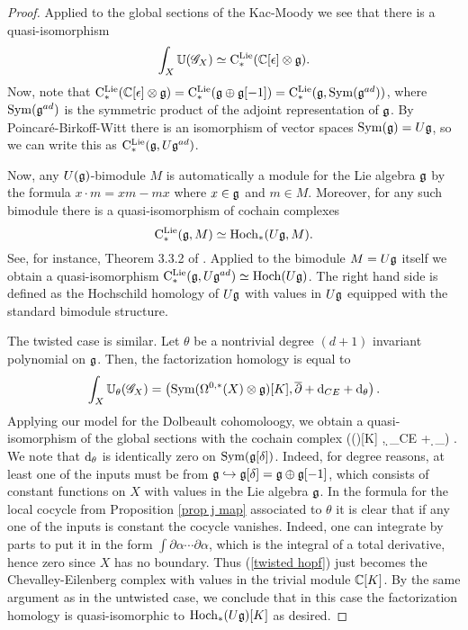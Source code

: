 \begin{proof}
Applied to the global sections of the Kac-Moody we see that there is a quasi-isomorphism
\[
\int_X \mathbb U(\mathscr G_X) \simeq {\rm C}^{\rm Lie}_*(\mathbb C[\epsilon] \otimes \mathfrak g) .
\]
Now, note that ${\rm C}^{\rm Lie}_*(\mathbb C[\epsilon] \otimes \mathfrak g) = {\rm C}^{\rm Lie}_*(\mathfrak g \oplus \mathfrak g[-1]) = {\rm C}^{\rm Lie}_*(\mathfrak g, {\rm Sym} (\mathfrak g^{ad}))$, where ${\rm Sym}(\mathfrak g^{ad})$ is the symmetric product of the adjoint representation of $\mathfrak g$. 
By Poincar\'{e}-Birkoff-Witt there is an isomorphism of vector spaces ${\rm Sym}(\mathfrak g) = U \mathfrak g$, so we can write this as ${\rm C}^{\rm Lie}_*(\mathfrak g, U \mathfrak g^{ad})$.

Now, any $U(\mathfrak g)$-bimodule $M$ is automatically a module for the Lie algebra $\mathfrak g$ by the formula $x \cdot m = xm - mx$ where $x \in \mathfrak g$ and $m \in M$.
Moreover, for any such bimodule there is a quasi-isomorphism of cochain complexes 
\[
{\rm C}^{\rm Lie}_*(\mathfrak g, M) \simeq {\rm Hoch}_*(U\mathfrak g, M) .
\]
See, for instance, Theorem 3.3.2 of \cite{LodayCyclic}.
Applied to the bimodule $M = U\mathfrak g$ itself we obtain a quasi-isomorphism ${\rm C}^{\rm Lie}_*(\mathfrak g , U\mathfrak g^{ad}) \simeq {\rm Hoch}(U\mathfrak g)$.
The right hand side is defined as the Hochschild homology of $U\mathfrak g$ with values in $U\mathfrak g$ equipped with the standard bimodule structure. 

The twisted case is similar. 
Let $\theta$ be a nontrivial degree $(d+1)$ invariant polynomial on $\mathfrak g$. 
Then, the factorization homology is equal to
\[
\int_X \mathbb U_\theta (\mathscr G_X) = \left({\rm Sym}(\Omega^{0,*}(X) \otimes \mathfrak g)[K] , \overline{\partial} + {\rm d}_{CE} + {\rm d}_\theta\right) .
\]
Applying our model for the Dolbeault cohomoloogy, we obtain a quasi-isomorphism of the global sections with the cochain complex
\beqn\label{twisted hopf}
\left(\Sym(\fg[\delta])[K] ,  \d_{CE} + \d_\theta \right) .
\eeqn
We note that ${\rm d}_\theta$ is identically zero on ${\rm Sym}(\mathfrak g[\delta])$. 
Indeed, for degree reasons, at least one of the inputs must be from $\mathfrak g \hookrightarrow \mathfrak g[\delta] = \mathfrak g \oplus \mathfrak g[-1]$, which consists of constant functions on $X$ with values in the Lie algebra $\mathfrak g$. 
In the formula for the local cocycle from Proposition \ref{prop j map} associated to $\theta$ it is clear that if any one of the inputs is constant the cocycle vanishes. 
Indeed, one can integrate by parts to put it in the form $\int \partial \alpha \cdots \partial \alpha$, which is the integral of a total derivative, hence zero since $X$ has no boundary.
Thus (\ref{twisted hopf}) just becomes the Chevalley-Eilenberg complex with values in the trivial module $\mathbb C[K]$. 
By the same argument as in the untwisted case, we conclude that in this case the factorization homology is quasi-isomorphic to ${\rm Hoch}_*(U \mathfrak g)[K]$ as desired.
\end{proof}

